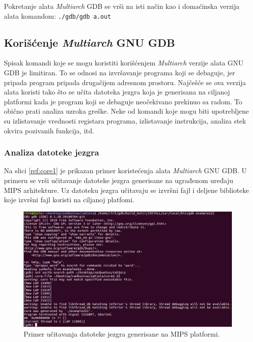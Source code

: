 \documentclass[12pt,oneside]{memoir}
\begin{document}
Pokretanje alata \emph{Multiarch} GDB se vrši na isti način kao i domaćinska verzija alata komandom:
\newline
\texttt{./gdb/gdb a.out}

\subsection{Korišćenje \emph{Multiarch} GNU GDB}

Spisak komandi koje se mogu koristiti korišćenjem \emph{Multiarch} verzije alata GNU GDB je limitiran. To se odnosi na izvršavanje programa koji se debaguje, jer pripada program pripada drugačijem adresnom prostoru. Najčešće se ova verzija alata koristi tako što se učita datoteka jezgra koja je generisana na ciljanoj platformi kada je program koji se debaguje neočekivano prekinuo sa radom. To obično prati analiza uzroka greške. Neke od komandi koje mogu biti upotrebljene su izlistavanje vrednosti registara programa, izlistavanje instrukcija, analiza stek okvira pozivanih funkcija, itd.

\subsubsection{Analiza datoteke jezgra}

Na slici \ref{ref:core1} je prikazan primer koristećenja alata \emph{Multiarch} GNU GDB. U primeru se vrši učitavanje datoteke jezgra generisane na ugrađenom uređaju MIPS arhitekture. Uz datoteku jezgra učitavaju se izvršni fajl i deljene biblioteke koje izvršni fajl koristi na ciljanoj platfomi.

\begin{figure}[h!]
	\begin{center}
		\includegraphics[scale=0.5]{slike/core1.png}
	\end{center}
	\caption{Primer učitavanja datoteke jezgra generisane na MIPS platformi.}
	\label{fig:core1}
\end{figure}
\end{document}
